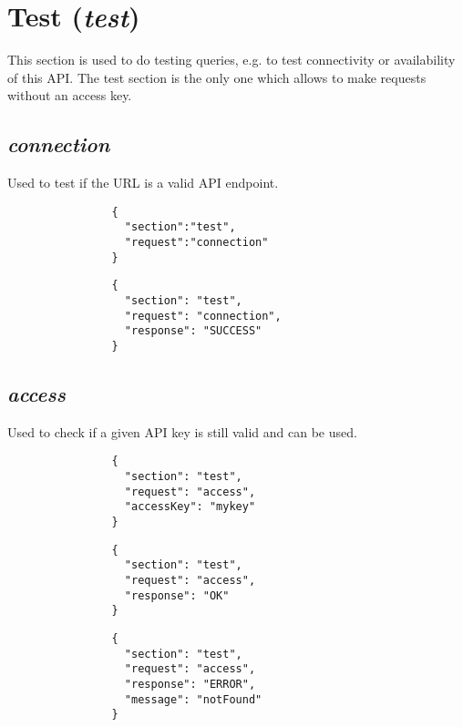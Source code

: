 \documentclass{article}
\begin{document}
	\section*{Test (\textit{test})}
		This section is used to do testing queries, e.g. to test connectivity or availability of this API. The test section is the only one which allows to make requests without an access key.
		\subsection*{\textit{connection}}
			Used to test if the URL is a valid API endpoint.
			{
				\color{blue}
				\begin{verbatim}
				{
				  "section":"test",
				  "request":"connection"
				}
				\end{verbatim}
		    }
			
			{
				\color{OliveGreen}
				\begin{verbatim}
				{
				  "section": "test",
				  "request": "connection",
				  "response": "SUCCESS"
				}
				\end{verbatim}
			}
		\subsection*{\textit{access}}
			Used to check if a given API key is still valid and can be used.
			{
				\color{blue}
				\begin{verbatim}
				{
				  "section": "test",
				  "request": "access",
				  "accessKey": "mykey"
				}
				\end{verbatim}
			}
			{
				\color{OliveGreen}
				\begin{verbatim}
				{
				  "section": "test",
				  "request": "access",
				  "response": "OK"
				}
				\end{verbatim}
			}
			{
				\color{BrickRed}
				\begin{verbatim}
				{
				  "section": "test",
				  "request": "access",
				  "response": "ERROR",
				  "message": "notFound"
				}
				\end{verbatim}
			}
\end{document}
